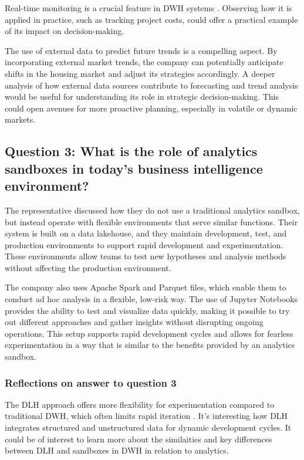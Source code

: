 Real-time monitoring is a crucial feature in DWH systems \cite[p. 1230]{CourseLitt}. Observing how it is applied in practice, such as tracking project costs, 
could offer a practical example of its impact on decision-making.

The use of external data to predict future trends is a compelling aspect. By incorporating external market trends, the company can potentially 
anticipate shifts in the housing market and adjust its strategies accordingly. A deeper analysis of how external data sources contribute to forecasting 
and trend analysis would be useful for understanding its role in strategic decision-making. This could open avenues for more proactive planning, 
especially in volatile or dynamic markets.

\subsection{Question 3: What is the role of analytics sandboxes in today's business intelligence environment?} 

The representative discussed how they do not use a traditional analytics sandbox, but instead operate with flexible environments that 
serve similar functions. Their system is built on a data lakehouse, and they maintain development, test, and production environments 
to support rapid development and experimentation. These environments allow teams to test new hypotheses and analysis methods without 
affecting the production environment.

The company also uses Apache Spark and Parquet files, which enable them to conduct ad hoc analysis in a flexible, low-risk way. The 
use of Jupyter Notebooks provides the ability to test and visualize data quickly, making it possible to try out different approaches and 
gather insights without disrupting ongoing operations. This setup supports rapid development cycles and allows for fearless experimentation 
in a way that is similar to the benefits provided by an analytics sandbox.
\subsubsection{Reflections on answer to question 3}

The DLH approach offers more flexibility for experimentation compared to traditional DWH, which often limits rapid iteration \cite{datalakehouse}. 
It's interesting how DLH integrates structured and unstructured data for dynamic development cycles. It could be of interest
to learn more about the similaities and key differences between DLH and sandboxes in DWH in relation to analytics.

